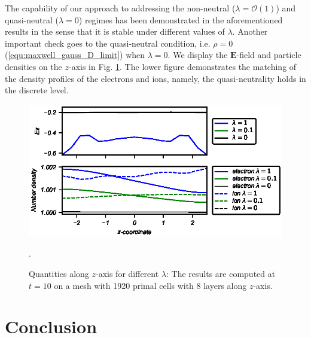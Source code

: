 \documentclass{article}
\begin{document}
The capability of our approach to addressing the non-neutral ($\lambda = \mathcal{O}(1)$) and quasi-neutral ($\lambda = 0$) regimes has been demonstrated in the aforementioned results in the sense that it is stable under different values of $\lambda$. Another important check goes to the quasi-neutral condition, i.e. $\rho = 0$ (\ref{equ:maxwell_gauss_D_limit}) when $\lambda = 0$. We display the $\mathbf{E}$-field and particle densities on the $z$-axis in Fig. \ref{fig:zaxis-data_vs_z-T_10}. The lower figure demonstrates the matching of the density profiles of the electrons and ions, namely, the quasi-neutrality holds in the discrete level.

\begin{figure}
    \centering
    \includegraphics{data-vs-z_stepVoltage.eps}
    \caption{Quantities along $z$-axis for different $\lambda$: The results are computed at $t = 10$ on a mesh with 1920 primal cells with 8 layers along $z$-axis.}.
    \label{fig:zaxis-data_vs_z-T_10}
\end{figure}


\section{Conclusion}


\end{document}
